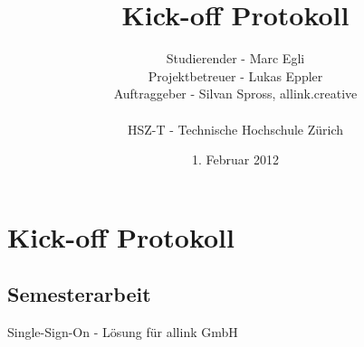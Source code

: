 \documentclass[]{scrreprt}
\title{Kick-off Protokoll}
\author{Studierender - Marc Egli\\
    Projektbetreuer - Lukas Eppler\\
    Auftraggeber - Silvan Spross, allink.creative\\
    \\
    HSZ-T - Technische Hochschule Zürich}
\date{1. Februar 2012}
\begin{document}
    \ifpdf
    \else
    \fi

    \maketitle



    \chapter{Kick-off Protokoll}

    \section{Semesterarbeit}
    Single-Sign-On - Lösung für allink GmbH
\end{document}
